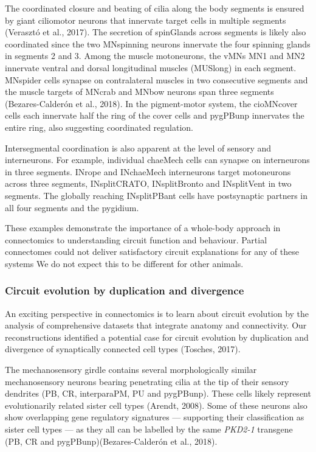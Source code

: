 \documentclass[
  11pt,
]{article}
\begin{document}
The coordinated closure and beating of cilia along the body segments is
ensured by giant ciliomotor neurons that innervate target cells in
multiple segments (Verasztó et al., 2017). The secretion of spinGlands
across segments is likely also coordinated since the two MNspinning
neurons innervate the four spinning glands in segments 2 and 3. Among
the muscle motoneurons, the vMNs MN1 and MN2 innervate ventral and
dorsal longitudinal muscles (MUSlong) in each segment. MNspider cells
synapse on contralateral muscles in two consecutive segments and the
muscle targets of MNcrab and MNbow neurons span three segments
(Bezares-Calderón et al., 2018). In the pigment-motor system, the
cioMNcover cells each innervate half the ring of the cover cells and
pygPBunp innervates the entire ring, also suggesting coordinated
regulation.

Intersegmental coordination is also apparent at the level of sensory and
interneurons. For example, individual chaeMech cells can synapse on
interneurons in three segments. INrope and INchaeMech interneurons
target motoneurons across three segments, INsplitCRATO, INsplitBronto
and INsplitVent in two segments. The globally reaching INsplitPBant
cells have postsynaptic partners in all four segments and the pygidium.

These examples demonstrate the importance of a whole-body approach in
connectomics to understanding circuit function and behaviour. Partial
connectomes could not deliver satisfactory circuit explanations for any
of these systems We do not expect this to be different for other
animals.

\subsubsection{Circuit evolution by duplication and
divergence}\label{circuit-evolution-by-duplication-and-divergence}

An exciting perspective in connectomics is to learn about circuit
evolution by the analysis of comprehensive datasets that integrate
anatomy and connectivity. Our reconstructions identified a potential
case for circuit evolution by duplication and divergence of synaptically
connected cell types (Tosches, 2017).

The mechanosensory girdle contains several morphologically similar
mechanosensory neurons bearing penetrating cilia at the tip of their
sensory dendrites (PB, CR, interparaPM, PU and pygPBunp). These cells
likely represent evolutionarily related sister cell types (Arendt,
2008). Some of these neurons also show overlapping gene regulatory
signatures --- supporting their classification as sister cell types ---
as they all can be labelled by the same \emph{PKD2-1} transgene (PB, CR
and pygPBunp)(Bezares-Calderón et al., 2018).
\end{document}
